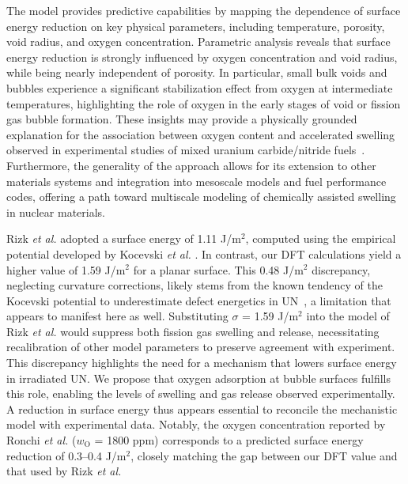 \documentclass[preprint,12pt,sort&compress]{elsarticle}
\newcommand{\?}{\stackrel{?}{=}}
\providecommand{\DIFaddend}{\protect\color{black}} %
\DeclareRobustCommand{\DIFaddend}{\DIFOaddend \let\includegraphics\DIFOincludegraphics} %
\begin{document}
\DIFaddend The model provides predictive capabilities by mapping the dependence of surface energy reduction on key physical parameters, including temperature, porosity, void radius, and oxygen concentration. Parametric analysis reveals that surface energy reduction is strongly influenced by oxygen concentration and void radius, while being nearly independent of porosity. In particular, small bulk voids and bubbles experience a significant stabilization effect from oxygen at intermediate temperatures, highlighting the role of oxygen in the early stages of void or fission gas bubble formation. These insights may provide a physically grounded explanation for the association between oxygen content and accelerated swelling observed in experimental studies of mixed uranium carbide/nitride fuels~\cite{Rogozkin2003}. Furthermore, the generality of the approach allows for its extension to other materials systems and integration into mesoscale models and fuel performance codes, offering a path toward multiscale modeling of chemically assisted swelling in nuclear materials.

Rizk \textit{et al.} adopted a surface energy of 1.11 J/m$^2$, computed using the empirical potential developed by Kocevski \textit{et al.} \cite{Kocevski2022II}. In contrast, our DFT calculations yield a higher value of 1.59 J/m$^2$ for a planar surface. This 0.48 J/m$^2$ discrepancy, neglecting curvature corrections, likely stems from the known tendency of the Kocevski potential to underestimate defect energetics in UN~\cite{AbdulHameed2024}, a limitation that appears to manifest here as well. Substituting $\sigma$ = 1.59 J/m$^2$ into the model of Rizk \textit{et al.} would suppress both fission gas swelling and release, necessitating recalibration of other model parameters to preserve agreement with experiment. This discrepancy highlights the need for a mechanism that lowers surface energy in irradiated UN. We propose that oxygen adsorption at bubble surfaces fulfills this role, enabling the levels of swelling and gas release observed experimentally. A reduction in surface energy thus appears essential to reconcile the mechanistic model with experimental data. Notably, the oxygen concentration reported by Ronchi \textit{et al.} ($w_\text{O}$ = 1800 ppm) corresponds to a predicted surface energy reduction of 0.3--0.4 J/m$^2$, closely matching the gap between our DFT value and that used by Rizk \textit{et al.}
\end{document}
